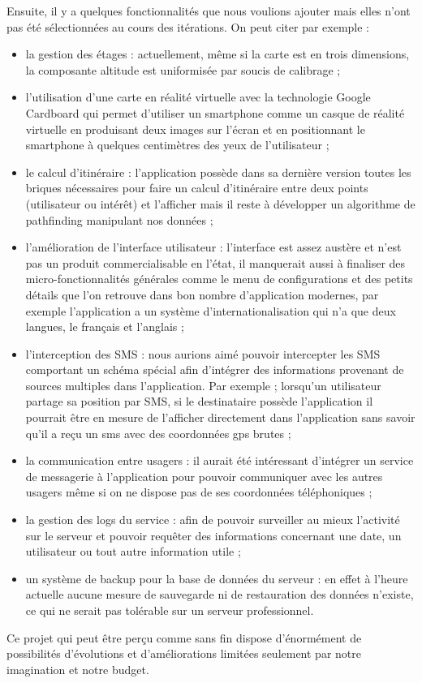 Ensuite, il y a quelques fonctionnalités que nous voulions ajouter mais elles n’ont pas été sélectionnées au cours des itérations. On peut citer par exemple :
\begin{itemize}
    \item la gestion des étages : actuellement, même si la carte est en trois dimensions, la composante altitude est uniformisée par soucis de calibrage ;
    \item l’utilisation d’une carte en réalité virtuelle avec la technologie Google Cardboard qui permet d’utiliser un smartphone comme un casque de réalité virtuelle en produisant deux images sur l’écran et en positionnant le smartphone à quelques centimètres des yeux de l’utilisateur ;
    \item le calcul d’itinéraire : l’application possède dans sa dernière version toutes les briques nécessaires pour faire un calcul d’itinéraire entre deux points (utilisateur ou intérêt) et l’afficher mais il reste à développer un algorithme de pathfinding manipulant nos données ;
    \item l’amélioration de l’interface utilisateur : l’interface est assez austère et n’est pas un produit commercialisable en l’état, il manquerait aussi à finaliser des micro-fonctionnalités générales comme le menu de configurations et des petits détails que l’on retrouve dans bon nombre d’application modernes, par exemple l’application a un système d’internationalisation qui n’a que deux langues, le français et l’anglais ;
    \item l’interception des SMS : nous aurions aimé pouvoir intercepter les SMS comportant un schéma spécial afin d’intégrer des informations provenant de sources multiples dans l’application. Par exemple ; lorsqu’un utilisateur partage sa position par SMS, si le destinataire possède l’application il pourrait être en mesure de l’afficher directement dans l’application sans savoir qu’il a reçu un sms avec des coordonnées gps brutes ;
    \item la communication entre usagers : il aurait été intéressant d’intégrer un service de messagerie à l’application pour pouvoir communiquer avec les autres usagers même si on ne dispose pas de ses coordonnées téléphoniques ;
    \item la gestion des logs du service : afin de pouvoir surveiller au mieux l’activité sur le serveur et pouvoir requêter des informations concernant une date, un utilisateur ou tout autre information utile ;
    \item un système de backup pour la base de données du serveur : en effet à l’heure actuelle aucune mesure de sauvegarde ni de restauration des données n’existe, ce qui ne serait pas tolérable sur un serveur professionnel.
\end{itemize}

Ce projet qui peut être perçu comme sans fin dispose d’énormément de possibilités d’évolutions et d’améliorations limitées seulement par notre imagination et notre budget.
